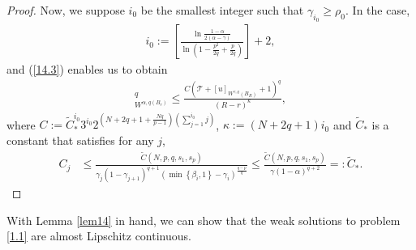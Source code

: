 \documentclass[reqno,10pt]{amsart}
\numberwithin{equation}{section}
\begin{document}
\begin{proof}
	Now, we suppose $i_0$ be the smallest integer such that $\gamma_{i_0}\geq \rho_0$. In the case,
	\begin{align*}
		i_0:=\left[\frac{\ln \frac{1-\alpha}{2(\alpha-\gamma)}}{\ln \left(1-\frac{p^2}{2q}+\frac{p}{2q}\right)}\right]+2,
	\end{align*}
	and (\ref{14.3}) enables us to obtain
	\begin{align*}
		[u]_{W^{\alpha, q\left(B_r\right)}}^q \leq \frac{C\left(\mathcal{T}+[u]_{W^{\gamma,q}\left(B_R\right)}+1\right)^q}{(R-r)^{\kappa}},
	\end{align*}
	where $C:=\widetilde{C}_*^{i_0} 3^{i_0} 2^{\left(N+2q+1+\frac{Nq}{p-1}\right)\left(\sum\limits_{j=1}^{i_0} j\right)}$, $ \kappa:=(N+2q+1) i_0$ and $\widetilde{C}_*$ is a constant that satisfies for any $j$, 
	\begin{align*}
		C_j &\le \frac{\widetilde{C}\left(N, p, q, s_1, s_p\right)}{\gamma_j(1-\gamma_{j+1})^{q+1}(\min\left\lbrace \beta_i,1\right\rbrace-\gamma_i )^{\frac{q-p}{q}}}\le \frac{\widetilde{C}\left(N, p, q, s_1, s_p\right)}{\gamma(1-\alpha)^{q+2}}=:\widetilde{C}_*.
	\end{align*}
\end{proof}

With Lemma \ref{lem14} in hand, we can show that the weak solutions to problem \eqref{1.1} are almost Lipschitz continuous.
\end{document}
